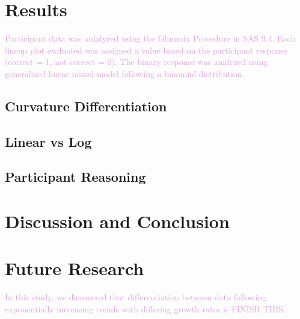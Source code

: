 \documentclass[]{interact}
\theoremstyle{plain}%
\theoremstyle{definition}
\theoremstyle{remark}
\begin{document}
\hypertarget{results}{%
\section{Results}\label{results}}

\textcolor{Plum}{
Participant data was anlalyzed using the Glimmix Procedure in SAS 9.4. Each lineup plot evaluated was assigned a value based on the participant response (correct = 1, not correct = 0). The binary response was analyzed using generalized linear mixed model following a binomial distribution.
}

\hypertarget{curvature-differentiation}{%
\subsection{Curvature Differentiation}\label{curvature-differentiation}}

\hypertarget{linear-vs-log}{%
\subsection{Linear vs Log}\label{linear-vs-log}}

\hypertarget{participant-reasoning}{%
\subsection{Participant Reasoning}\label{participant-reasoning}}

\hypertarget{discussion-and-conclusion}{%
\section{Discussion and Conclusion}\label{discussion-and-conclusion}}

\hypertarget{future-research}{%
\section{Future Research}\label{future-research}}

\textcolor{Plum}{
In this study, we discovered that differentiation between data following exponentially increasing trends with differing growth rates is FINISH THIS.
}
\end{document}
